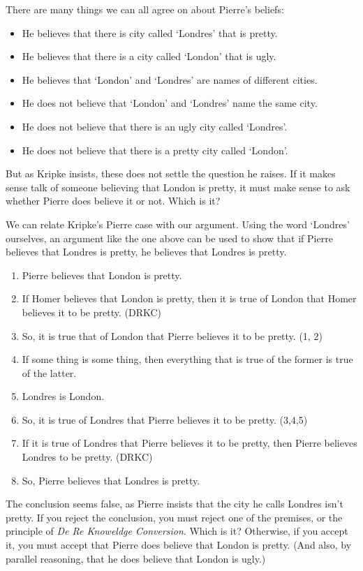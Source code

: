 \documentclass[../../../include/open-logic-chapter]{subfiles}
\begin{document}
There are many things we can all agree on about Pierre's beliefs:

\begin{itemize}
    \item He believes that there is city called `Londres' that is pretty.
    \item He believes that there is a city called `London' that is ugly.
    \item He believes that `London' and `Londres' are names of different cities.
    \item He does not believe that `London' and `Londres' name the same city.
    \item He does not believe that there is an ugly city called `Londres'.
    \item He does not believe that there is a pretty city called `London'. 
\end{itemize}

But as Kripke insists, these does not settle the question he raises.
If it makes sense talk of someone believing that London is pretty, 
it must make sense to ask whether Pierre does believe it or not. 
Which is it?

We can relate Kripke's Pierre case with our argument. Using the 
word `Londres' ourselves, an argument like
the one above can be used to show that if Pierre believes that Londres
is pretty, he believes that Londres is pretty. 

\begin{enumerate}
\item Pierre believes that London is pretty. 
\item If Homer believes that London is pretty, then it is true of London 
that Homer believes it to be pretty. (DRKC)
\item So, it is true that of London that Pierre believes it to be pretty. (1, 2)
\item If some thing is some thing, then everything that is true of the
former is true of the latter.
\item Londres is London.
\item So, it is true of Londres that Pierre believes it to be pretty. (3,4,5)
\item If it is true of Londres that Pierre believes it to be pretty, then Pierre believes Londres to be pretty. (DRKC)
\item So, Pierre believes that Londres is pretty.
\end{enumerate}

The conclusion seems false, as Pierre insists that the city he calls
Londres isn't pretty. If you reject the conclusion, you must reject
one of the premises, or the principle of \emph{De Re Knoweldge Conversion}.
Which is it? Otherwise, if you accept it, you must accept that Pierre
does believe that London is pretty. (And also, by parallel reasoning,
that he does believe that London is ugly.)
\end{document}
